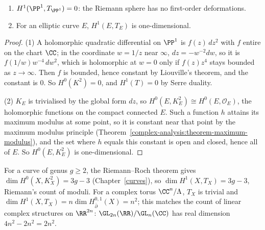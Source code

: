 \begin{proposition}\label{deformations:proposition-curves-deformations}
\begin{enumerate}
\item $H^1(\PP^1, T_{\PP^1}) = 0$: the Riemann sphere has no first-order deformations.
\item For an elliptic curve $E$, $H^1(E, T_E)$ is one-dimensional.
\end{enumerate}
\end{proposition}

\begin{proof}
(1) A holomorphic quadratic differential on $\PP^1$ is $f(z)\,dz^2$ with $f$ entire on the chart $\CC$; in the coordinate $w = 1/z$ near $\infty$, $dz = -w^{-2}dw$, so it is $f(1/w)w^{-4}\,dw^2$, which is holomorphic at
$w = 0$ only if $f(z)z^4$ stays bounded as $z \to \infty$. Then $f$ is bounded, hence constant by Liouville's theorem, and the constant is $0$. So $H^0(K^2) = 0$, and $H^1(T) = 0$ by Serre duality.

(2) $K_E$ is trivialised by the global form $dz$, so $H^0(E, K_E^2) \cong H^0(E, \mathcal{O}_E)$, the holomorphic functions on the compact connected $E$. Such a function $h$ attains its maximum modulus at some point, so it is constant near that point by the maximum modulus principle
(Theorem~\ref{complex-analysis:theorem-maximum-modulus}), and the set where $h$ equals this constant is open and closed, hence all of $E$. So $H^0(E, K_E^2)$ is one-dimensional.
\end{proof}

For a curve of genus $g \geq 2$, the Riemann--Roch theorem gives $\dim H^0(X, K_X^2) = 3g - 3$ (Chapter~\ref{curves}), so $\dim H^1(X, T_X) = 3g - 3$, Riemann's count of moduli. For a complex torus $\CC^n/\Lambda$,
$T_X$ is trivial and $\dim H^1(X, T_X) = n\dim H^{0,1}_{\bar\partial}(X) = n^2$; this matches the count of linear complex structures on $\RR^{2n}$: $\GL_{2n}(\RR)/\GL_n(\CC)$ has real dimension $4n^2 - 2n^2 = 2n^2$.

